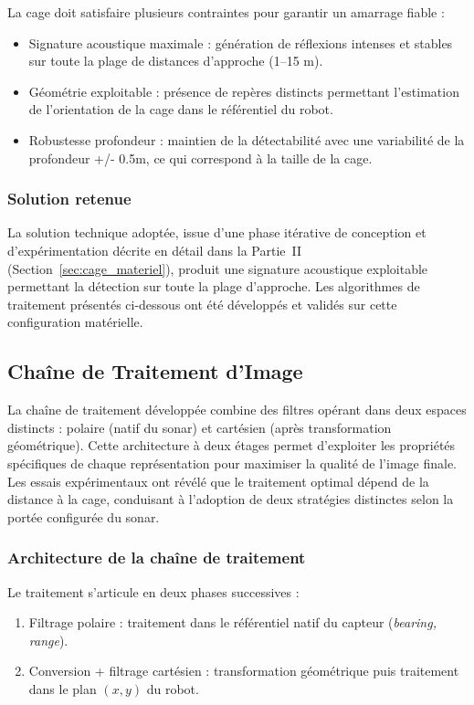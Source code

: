 La cage doit satisfaire plusieurs contraintes pour garantir un amarrage fiable :
\begin{itemize}
    \item Signature acoustique maximale : génération de réflexions intenses et stables sur toute la plage de distances d'approche (1--15 m).
    \item Géométrie exploitable : présence de repères distincts permettant l'estimation de l'orientation de la cage dans le référentiel du robot.
    \item Robustesse profondeur : maintien de la détectabilité avec une variabilité de la profondeur +/- 0.5m, ce qui correspond à la taille de la cage.
\end{itemize}

\subsubsection*{Solution retenue}

La solution technique adoptée, issue d'une phase itérative de conception et d'expérimentation décrite en détail dans la Partie~II (Section~\ref{sec:cage_materiel}), produit une signature acoustique exploitable permettant la détection sur toute la plage d'approche. Les algorithmes de traitement présentés ci-dessous ont été développés et validés sur cette configuration matérielle.


\subsection{Chaîne de Traitement d'Image}

La chaîne de traitement développée combine des filtres opérant dans deux espaces distincts : polaire (natif du sonar) et cartésien (après transformation géométrique). Cette architecture à deux étages permet d'exploiter les propriétés spécifiques de chaque représentation pour maximiser la qualité de l'image finale. Les essais expérimentaux ont révélé que le traitement optimal dépend de la distance à la cage, conduisant à l'adoption de deux stratégies distinctes selon la portée configurée du sonar.

\subsubsection*{Architecture de la chaîne de traitement}

Le traitement s'articule en deux phases successives :
\begin{enumerate}
    \item Filtrage polaire : traitement dans le référentiel natif du capteur (\textit{bearing, range}).
    \item Conversion + filtrage cartésien : transformation géométrique puis traitement dans le plan $(x,y)$ du robot.
\end{enumerate}

